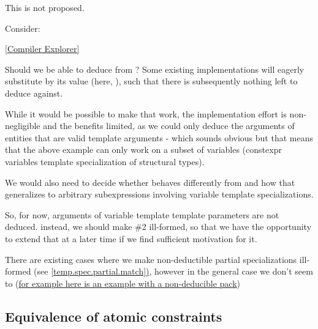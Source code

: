 \documentclass{wg21}
\begin{document}
This is not proposed.

Consider:


\href{https://godbolt.org/z/sqTfEojh4}{[Compiler Explorer]}


Should we be able to deduce  from ?
Some existing implementations will eagerly substitute  by its value (here, ),
such that there is subsequently nothing left to deduce  against.

While it would be possible to make that work, the implementation effort is non-negligible and the benefits limited,
as we could only deduce the arguments of entities that are valid template arguments - which sounds obvious but that means that the
above example can only work on a subset of variables (constexpr variables template specialization of structural types).

We would also need to decide whether  behaves differently from 
and how that generalizes to arbitrary subexpressions involving variable template specializations.

So, for now, arguments of variable template template parameters are not deduced.
instead, we should make \#2 ill-formed, so that we have the opportunity to extend that at a later time if we find sufficient motivation for it.

There are existing cases where we make non-deductible partial specializations ill-formed (see \href{https://eel.is/c++draft/temp.spec.partial#match-3}{[temp.spec.partial.match])},
however in the general case we don't seem to (\href{https://gcc.godbolt.org/z/fv1e8nnsf}{for example here is an example with a non-deducible pack})


\subsection{Equivalence of atomic constraints}
\end{document}
